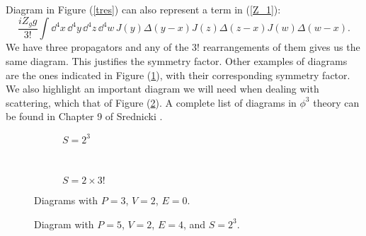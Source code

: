 Diagram in Figure (\ref{tres}) can also represent a term in (\ref{Z_1}):
 \begin{equation}
     \frac{iZ_g g}{ 3!}\int\dd^4x\,\dd^4y\,\dd^4z\,\dd^4w\, J(y)\Delta(y-x)J(z)\Delta(z-x)J(w)\Delta(w-x).
 \end{equation}
 We have three propagators and any of the $3!$ rearrangements of them gives us the same diagram. This justifies the symmetry factor. Other examples of diagrams are the ones indicated in Figure (\ref{p3v2e0}), with their corresponding symmetry factor. We also highlight an important diagram we will need when dealing with scattering, which that of Figure (\ref{tree_diagramJ}). A complete list of diagrams in $\phi^3$ theory can be found in Chapter 9 of Srednicki \cite{srednicki2007quantum}.\\
 \begin{figure}[h]
    \begin{subfigure}[b]{0.45\textwidth}
    \centering
    \caption{$S=2^3$}
    \end{subfigure}
    ~ 
    \begin{subfigure}[b]{0.45\textwidth}
    \centering
    \caption{$S=2\times 3!$}
    \end{subfigure}
    \caption{Diagrams with $P=3$, $V=2$, $E=0$.}
\label{p3v2e0}
\end{figure}
\begin{figure}
    \centering
    \caption{Diagram with $P=5$, $V=2$, $E=4$, and $S=2^3$.}
    \label{tree_diagramJ}
\end{figure}


